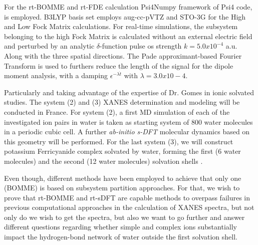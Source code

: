 \documentclass[notitlepage,12pt]{report}
\begin{document}
	For the rt-BOMME and rt-FDE calculation Psi4Numpy\supercite{smith2018psi4numpy} framework of Psi4 code\supercite{smith2020psi4}, is employed. B3LYP basis set employs aug-cc-pVTZ and STO-3G for the High and Low Fock Matrix calculations. For real-time simulations, the subsystem belonging to the high Fock Matrix is calculated without an external electric field and perturbed by an analytic $\delta$-function pulse os strength $k=5.0x10^{-4}$ a.u. Along with the three spatial directions. The Pade approximant-based Fourier Transform is used to furthers reduce the length of the signal for the dipole moment analysis, with a damping $\epsilon^{-\lambda \dot{t}}$ with $\lambda=3.0x10-4$. 

	Particularly and taking advantage of the expertise of Dr. Gomes in ionic solvated studies. The system (2) and (3) XANES determination and modeling will be conducted in France. For system (2), a first MD simulation of each of the investigated ion pairs in water is taken as starting system \supercite{aziz2008cation} of 800 water molecules in a periodic cubic cell. A further \textit{ab-initio s-DFT} molecular dynamics\supercite{genova2016avoiding} based on this geometry will be performed.  For the last system (3), we will construct potassium Ferricyanide complex solvated by water, forming the first (6 water molecules) and the second (12 water molecules) solvation shells \supercite{uudsemaa2003density,seidel2011valence}. 
	
	Even though, different methods have been employed to achieve that only one (BOMME) is based on subsystem partition approaches. For that, we wish to prove that rt-BOMME and rt-sDFT are capable methods to overpass failures in previous computational approaches in the calculation of XANES spectra, but not only do we wish to get the spectra, but also we want to go further and answer different questions regarding whether simple and complex ions substantially impact the hydrogen-bond network of water outside the first solvation shell. 

\printbibliography
\end{document}

